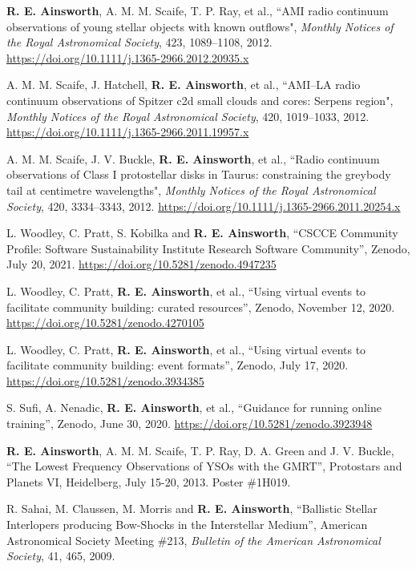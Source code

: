 \begin{cvpubs}
{\begin{cvetar}
        \item {\textbf{R. E. Ainsworth}, A. M. M. Scaife, T. P. Ray, et al., ``AMI radio continuum observations of young stellar objects with known outflows", \textit{Monthly Notices of the Royal Astronomical Society}, 423, 1089--1108, 2012. \url{https://doi.org/10.1111/j.1365-2966.2012.20935.x}}
        \item {A. M. M. Scaife, J. Hatchell, \textbf{R. E. Ainsworth}, et al., ``AMI--LA radio continuum observations of Spitzer c2d small clouds and cores: Serpens region", \textit{Monthly Notices of the Royal Astronomical Society}, 420, 1019--1033, 2012. \url{https://doi.org/10.1111/j.1365-2966.2011.19957.x}}
        \item {A. M. M. Scaife, J. V. Buckle, \textbf{R. E. Ainsworth}, et al., ``Radio continuum observations of Class I protostellar disks in Taurus: constraining the greybody tail at centimetre wavelengths", \textit{Monthly Notices of the Royal Astronomical Society}, 420, 3334--3343, 2012. \url{https://doi.org/10.1111/j.1365-2966.2011.20254.x}}
      \end{cvetar}
    }
\end{cvpubs}

\begin{cvpubs}
  \cvpub
    {
      \begin{cvetar}
        \item {L. Woodley, C. Pratt, S. Kobilka and \textbf{R. E. Ainsworth}, ``CSCCE Community Profile: Software Sustainability Institute Research Software Community'', Zenodo, July 20, 2021. \url{https://doi.org/10.5281/zenodo.4947235}}
        \item {L. Woodley, C. Pratt, \textbf{R. E. Ainsworth}, et al., ``Using virtual events to facilitate community building: curated resources'', Zenodo, November 12, 2020. \url{https://doi.org/10.5281/zenodo.4270105}}
        \item {L. Woodley, C. Pratt, \textbf{R. E. Ainsworth}, et al., ``Using virtual events to facilitate community building: event formats'', Zenodo, July 17, 2020. \url{https://doi.org/10.5281/zenodo.3934385}}
        \item {S. Sufi, A. Nenadic, \textbf{R. E. Ainsworth}, et al., ``Guidance for running online training'', Zenodo, June 30, 2020. \url{https://doi.org/10.5281/zenodo.3923948}}
        \item {\textbf{R. E. Ainsworth}, A. M. M. Scaife, T. P. Ray, D. A. Green and J. V. Buckle, ``The Lowest Frequency Observations of YSOs with the GMRT'', Protostars and Planets VI, Heidelberg, July 15-20, 2013. Poster \#1H019.}
        \item {R. Sahai, M. Claussen, M. Morris and \textbf{R. E. Ainsworth}, ``Ballistic Stellar Interlopers producing Bow-Shocks in the Interstellar Medium'', American Astronomical Society Meeting \#213, \textit{Bulletin of the American Astronomical Society}, 41, 465, 2009.}
      \end{cvetar}
    }
\end{cvpubs}

